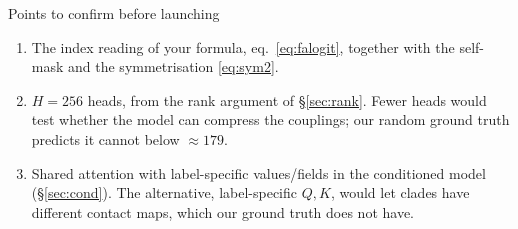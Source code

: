 \begin{checkbox}{Points to confirm before launching}
\begin{enumerate}[nosep]
\item The index reading of your formula, eq.~\eqref{eq:falogit}, together with the self-mask and the symmetrisation \eqref{eq:sym2}.
\item $H=256$ heads, from the rank argument of \S\ref{sec:rank}. Fewer heads would test whether the model can
      compress the couplings; our random ground truth predicts it cannot below $\approx179$.
\item Shared attention with label-specific values/fields in the conditioned model (\S\ref{sec:cond}). The
      alternative, label-specific $Q,K$, would let clades have different contact maps, which our ground truth does not have.
\end{enumerate}
\end{checkbox}
